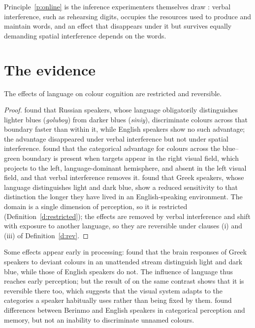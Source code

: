 \documentclass{situationist-preprint}
\begin{document}
Principle~\ref{p:online} is the inference experimenters themselves draw \citep{KayKempton1984,Winawer2007}: verbal interference, such as rehearsing digits, occupies the resources used to produce and maintain words, and an effect that disappears under it but survives equally demanding spatial interference depends on the words.

\section{The evidence}

\begin{lemma}[Colour]\label{l:colour}
The effects of language on colour cognition are restricted and reversible.
\end{lemma}

\begin{proof}
\citet{Winawer2007} found that Russian speakers, whose language obligatorily distinguishes lighter blues (\emph{goluboy}) from darker blues (\emph{siniy}), discriminate colours across that boundary faster than within it, while English speakers show no such advantage; the advantage disappeared under verbal interference but not under spatial interference. \citet{Gilbert2006} found that the categorical advantage for colours across the blue--green boundary is present when targets appear in the right visual field, which projects to the left, language-dominant hemisphere, and absent in the left visual field, and that verbal interference removes it. \citet{Athanasopoulos2009} found that Greek speakers, whose language distinguishes light and dark blue, show a reduced sensitivity to that distinction the longer they have lived in an English-speaking environment. The domain is a single dimension of perception, so it is restricted (Definition~\ref{d:restricted}); the effects are removed by verbal interference and shift with exposure to another language, so they are reversible under clauses (i) and (iii) of Definition~\ref{d:rev}.
\end{proof}

Some effects appear early in processing: \citet{Thierry2009} found that the brain responses of Greek speakers to deviant colours in an unattended stream distinguish light and dark blue, while those of English speakers do not. The influence of language thus reaches early perception; but the result of \citet{Athanasopoulos2009} on the same contrast shows that it is reversible there too, which suggests that the visual system adapts to the categories a speaker habitually uses rather than being fixed by them. \citet{Roberson2000} found differences between Berinmo and English speakers in categorical perception and memory, but not an inability to discriminate unnamed colours.
\end{document}
